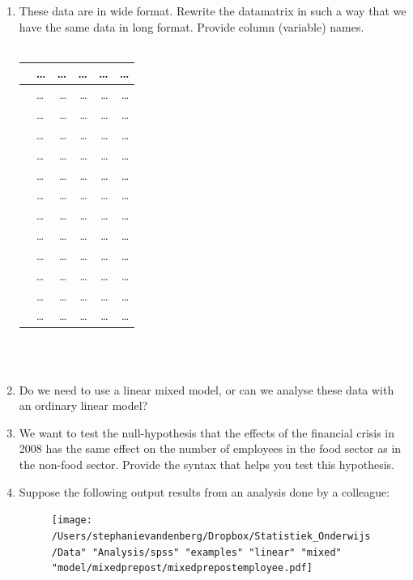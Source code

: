 \documentclass[]{report}\usepackage[]{graphicx}\usepackage[]{color}
\begin{document}
\begin{enumerate}
\item These data are in wide format. Rewrite the datamatrix in such a way that we have the same data in long format. Provide column (variable) names. 
\\
 \\
 \begin{tabular}{llrrrr}
   & \dots & \dots  & \dots & \dots  & \dots  \\ \hline
  & \dots & \dots  & \dots & \dots  & \dots  \\
  & \dots & \dots  & \dots & \dots  & \dots  \\
  & \dots & \dots  & \dots & \dots  & \dots  \\
  & \dots & \dots  & \dots & \dots  & \dots  \\
  & \dots & \dots  & \dots & \dots  & \dots  \\
  & \dots & \dots  & \dots & \dots  & \dots  \\
  & \dots & \dots  & \dots & \dots  & \dots  \\
  & \dots & \dots  & \dots & \dots  & \dots  \\
  & \dots & \dots  & \dots & \dots  & \dots  \\
  & \dots & \dots  & \dots & \dots  & \dots  \\
  & \dots & \dots  & \dots & \dots  & \dots  \\
  & \dots & \dots  & \dots & \dots  & \dots  \\
 \end{tabular}
\\
\\
\item Do we need to use a linear mixed model, or can we analyse these data with an ordinary linear model?
\item We want to test the null-hypothesis that the effects of the financial crisis in 2008 has the same effect on the number of employees in the food sector as in the non-food sector. Provide the syntax that helps you test this hypothesis. 
\item Suppose the following output results from an analysis done by a colleague:

\begin{figure}[h]
    \begin{center}
       \texttt{[image: /Users/stephanievandenberg/Dropbox/Statistiek\_Onderwijs/Data" "Analysis/spss" "examples" "linear" "mixed" "model/mixedprepost/mixedprepostemployee.pdf]}
    \end{center}
\end{figure}


\end{enumerate}
\end{document}
